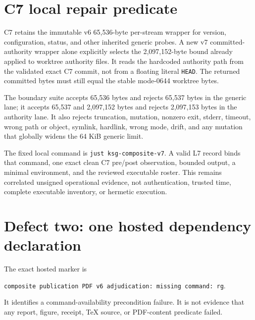 \documentclass[11pt,a4paper]{article}
\begin{document}
\section{C7 local repair predicate}

C7 retains the immutable v6 65,536-byte per-stream wrapper for version, configuration, status, and
other inherited generic probes. A new v7 committed-authority wrapper alone explicitly selects the
2,097,152-byte bound already applied to worktree authority files. It reads the hardcoded authority
path from the validated exact C7 commit, not from a floating literal \texttt{HEAD}. The returned
committed bytes must still equal the stable mode-0644 worktree bytes.

The boundary suite accepts 65,536 bytes and rejects 65,537 bytes in the generic lane; it accepts
65,537 and 2,097,152 bytes and rejects 2,097,153 bytes in the authority lane. It also rejects
truncation, mutation, nonzero exit, stderr, timeout, wrong path or object, symlink, hardlink, wrong
mode, drift, and any mutation that globally widens the 64 KiB generic limit.

The fixed local command is \texttt{just ksg-composite-v7}. A valid L7 record binds that command,
one exact clean C7 pre/post observation, bounded output, a minimal environment, and the reviewed
executable roster. This remains correlated unsigned operational evidence, not authentication,
trusted time, complete executable inventory, or hermetic execution.

\clearpage
\section{Defect two: one hosted dependency declaration}

The exact hosted marker is
\begin{center}
\texttt{composite publication PDF v6 adjudication: missing command: rg}.
\end{center}
It identifies a command-availability precondition failure. It is not evidence that any report,
figure, receipt, TeX source, or PDF-content predicate failed.
\end{document}
